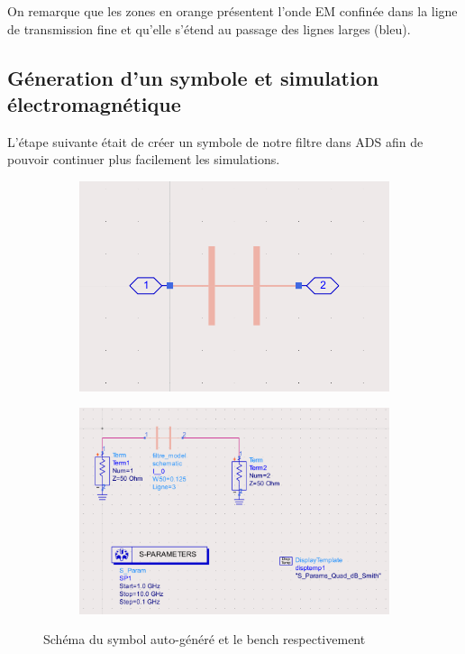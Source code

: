 \documentclass[a4paper]{article}
\begin{document}
On remarque que les zones en orange pr\'esentent l'onde EM confin\'ee dans la ligne de transmission fine et qu'elle s'\'etend au
passage des lignes larges (bleu).

\subsection{G\'eneration d'un symbole et simulation \'electromagn\'etique}

L'\'etape suivante \'etait de cr\'eer un symbole de notre filtre dans ADS afin de pouvoir continuer plus facilement les simulations.

\begin{figure}[!htb]
  \begin{subfigure}[t]{.5\linewidth}
      \centering
      \includegraphics[width=0.99\linewidth]{auto_generated_schematic_copper.png}
      \label{fig:auto_generated_schematic_copper}
  \end{subfigure}%
  \begin{subfigure}[t]{.5\linewidth}
    \centering
    \includegraphics[width=1\linewidth]{filtre_symbol.png}
    \label{fig:filtre_symbol}
  \end{subfigure}%
  \caption{Sch\'ema du symbol auto-g\'en\'er\'e et le bench respectivement}
  \label{fig:filtre_symbol_bench}
\end{figure}
\end{document}
